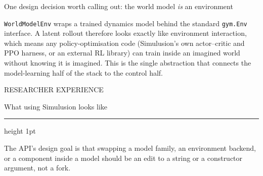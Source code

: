 \documentclass[10pt,a4paper]{article}
\newcommand{\kicker}[1]{{\footnotesize\displayfont\color{accent}\MakeUppercase{#1}}}
\newcommand{\pagetitle}[2]{%
  \kicker{#1}\par\vspace{1.5mm}
  {\Huge\displayfont\color{ink} #2}\par\vspace{2.5mm}
  {\color{rule}\hrule height 1pt}\par\vspace{4mm}}
\newcommand{\subhead}[1]{{\displayfont\color{ink} #1}\par\vspace{1mm}}
\newcommand{\badge}[3]{\tcbox[on line,boxsep=0pt,left=3pt,right=3pt,top=1.4pt,bottom=1.4pt,
  boxrule=0pt,arc=2pt,colback=#1,coltext=#2]{\scriptsize\displayfont\MakeUppercase{#3}}}
\newcommand{\bimpl}{\badge{greensoft}{green}{implemented}}
\begin{document}
\vspace{2.5mm}
\begin{callout}
{\footnotesize
\subhead{One design decision worth calling out: the world model \emph{is} an environment}
\texttt{WorldModelEnv} wraps a trained dynamics model behind the standard \texttt{gym.Env}
interface. A latent rollout therefore looks exactly like environment interaction, which means any
policy-optimisation code (Simulusion's own actor–critic and PPO harness, or an external RL library)
can train inside an imagined world without knowing it is imagined. This is the single abstraction
that connects the model-learning half of the stack to the control half. \bimpl}
\end{callout}

\newpage
\pagetitle{Researcher experience}{What using Simulusion looks like}

{\footnotesize
The API's design goal is that swapping a model family, an environment backend, or a component
inside a model should be an edit to a string or a constructor argument, not a fork.}

\vspace{3.5mm}
\end{document}
